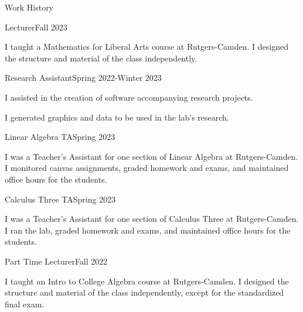 \documentclass{resume} %
\begin{document}




\begin{rSection}{Work History}
 
\begin{rSubsection}{Lecturer}{Fall 2023}{}{}
\item I taught a Mathematics for Liberal Arts course at Rutgers-Camden. I designed the structure and material of the class independently.
\end{rSubsection}

\begin{rSubsection}{Research Assistant}{Spring 2022-Winter 2023}{}{}
\item I assisted in the creation of software accompanying research projects.
\item I generated graphics and data to be used in the lab's research.
\end{rSubsection}


\begin{rSubsection}{Linear Algebra TA}{Spring 2023}{}{}
\item I was a Teacher's Assistant for one section of Linear Algebra at Rutgers-Camden. I monitored canvas assignments, graded homework and exams, and maintained office hours for the students.
\end{rSubsection}

\begin{rSubsection}{Calculus Three TA}{Spring 2023}{}{}
\item I was a Teacher's Assistant for one section of Calculus Three at Rutgers-Camden. I ran the lab, graded homework and exams, and maintained office hours for the students.
\end{rSubsection}

\begin{rSubsection}{Part Time Lecturer}{Fall 2022}{}{}
\item I taught an Intro to College Algebra course at Rutgers-Camden. I designed the structure and material of the class independently, except for the standardized final exam.
\end{rSubsection}


\end{rSection}
\end{document}
